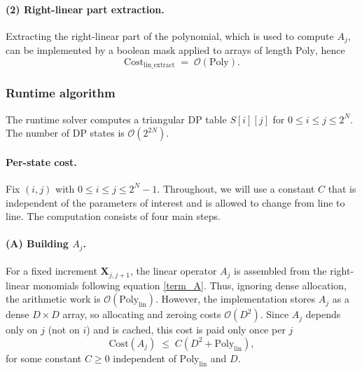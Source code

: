 \documentclass{article}%
\begin{document}
\paragraph{(2) Right-linear part extraction.}
Extracting the right-linear part of the polynomial, which is used to compute $A_j$, can be implemented by a boolean mask applied to arrays of length $\mathrm{Poly}$, hence
\begin{equation}
  \label{eq:lin-extract-cost}
  \mathrm{Cost}_{\mathrm{lin\_extract}}
  \;=\;\mathcal{O}\left(
  \mathrm{Poly}\right).
\end{equation}


\subsubsection{Runtime algorithm}


The runtime solver computes a triangular DP table $S[i][j]$ for $0 \le i \le j \le 2^N$.
The number of DP states is $\mathcal{O}(2^{2N})$.

\paragraph{Per-state cost.}
Fix $(i,j)$ with $0 \le i \le j \le 2^N-1$. Throughout, we will use a constant $C$ that is independent of the parameters of interest and is allowed to change from line to line.\newline
The computation consists of four main steps.

\paragraph{(A) Building $A_j$.}
For a fixed increment $ \mathbf{X}_{j, j+1}$, the linear operator $A_j$ is assembled from the right-linear monomials following equation \eqref{term_A}.\newline
Thus, ignoring dense allocation, the arithmetic work is $\mathcal{O}(\mathrm{Poly}_{\mathrm{lin}})$.
However, the implementation stores $A_j$ as a dense $D\times D$ array, so allocating and zeroing costs $\mathcal{O}(D^2)$.
Since $A_j$ depends only on $j$ (not on $i$) and is cached, this cost is paid only once per $j$
\begin{equation}
  \label{eq:A-build-cost}
   \mathrm{Cost}(A_j)
  \;\leq\;
  C \!\left(
    D^2 + \mathrm{Poly}_{\mathrm{lin}}
  \right),
\end{equation}
for some constant $C \geq 0$ independent of $\mathrm{Poly}_{\mathrm{lin}}$ and $D$.
\end{document}
